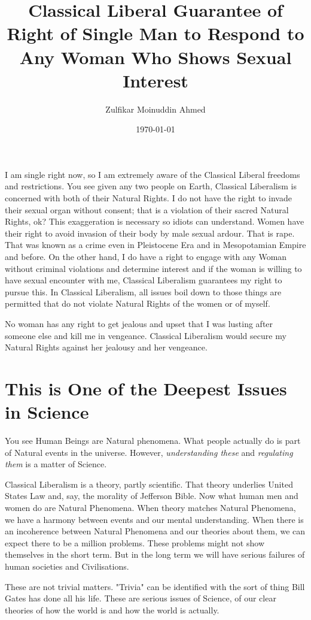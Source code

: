 \documentclass{amsart}
\title{Classical Liberal Guarantee of Right of Single Man to Respond to Any Woman Who Shows Sexual Interest}
\author{Zulfikar Moinuddin Ahmed}
\date{\today}
\begin{document}
\maketitle

I am single right now, so I am extremely aware of the Classical Liberal freedoms and restrictions.  You see given any two people on Earth, Classical Liberalism is concerned with both of their Natural Rights.  I do not have the right to invade their sexual organ without consent; that is a violation of their sacred Natural Rights, ok?  This exaggeration is necessary so idiots can understand.  Women have their right to avoid invasion of their body by male sexual ardour.  That is rape.  That was known as a crime even in Pleistocene Era and in Mesopotamian Empire and before.  On the other hand, I do have a right to engage with any Woman without criminal violations and determine interest and if the woman is willing to have sexual encounter with me, Classical Liberalism guarantees my right to pursue this.  In Classical Liberalism, all issues boil down to those things are permitted that do not violate Natural Rights of the women or of myself.  

No woman has any right to get jealous and upset that I was lusting after someone else and kill me in vengeance.  Classical Liberalism would secure my Natural Rights against her jealousy and her vengeance.

\section{This is One of the Deepest Issues in Science}

You see Human Beings are Natural phenomena.  What people actually do is part of Natural events in the universe.  However, {\em understanding these} and {\em regulating them} is a matter of Science.  

Classical Liberalism is a theory, partly scientific.  That theory underlies United States Law and, say, the morality of Jefferson Bible.  Now what human men and women do are Natural Phenomena.  When theory matches Natural Phenomena, we have a harmony between events and our mental understanding.  When there is an incoherence between Natural Phenomena and our theories about them, we can expect there to be a million problems.  These problems might not show themselves in the short term.  But in the long term we will have serious failures of human societies and Civilisations.

These are not trivial matters.  "Trivia" can be identified with the sort of thing Bill Gates has done all his life.  These are serious issues of Science, of our clear theories of how the world is and how the world is actually.
\end{document}

